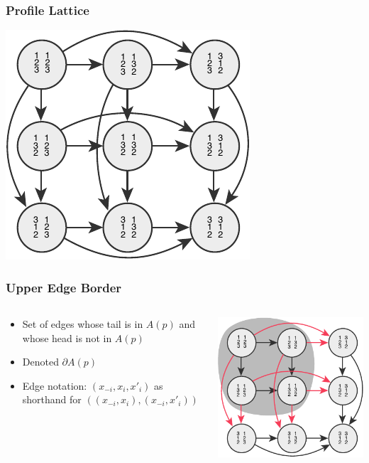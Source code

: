 \documentclass[aspectratio=169]{beamer}
\begin{document}
		\begin{frame}
			\frametitle{Profile Lattice}

			\centerline{\includegraphics[height=0.7\paperheight, keepaspectratio]{../figures/profile_lattice.pdf}}
		\end{frame}

		\begin{frame}
			\frametitle{Upper Edge Border}

			\begin{columns}
				\begin{column}{0.5\textwidth}
					\begin{itemize}
						\item Set of edges whose tail is in $A(p)$ and whose head is not in $A(p)$
						\item Denoted $\partial A(p)$
						\item Edge notation: $(x_{-i}, x_i, x'_i)$ as shorthand for $((x_{-i},x_i), (x_{-i},x'_i))$
					\end{itemize}
				\end{column}

				\begin{column}{0.5\textwidth}
					\includegraphics[height=0.7\paperheight, keepaspectratio]{../figures/profile_lattice_edge_border.pdf}
				\end{column}
			\end{columns}

		\end{frame}
\end{document}
